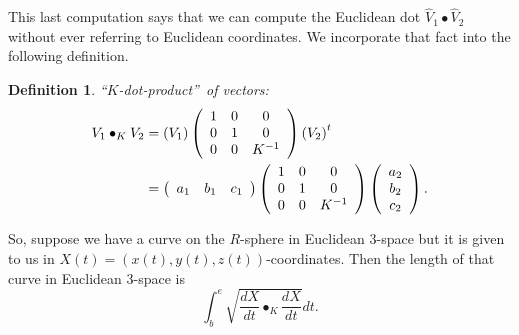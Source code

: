 \documentclass{article}%
\newtheorem{definition}[theorem]{Definition}
\begin{document}
This last computation says that we can compute the Euclidean dot $\hat{V}%
_{1}\bullet\hat{V}_{2}$ without ever referring to Euclidean coordinates. We
incorporate that fact into the following definition.

\begin{definition}
\textquotedblleft$K$-dot-product\textquotedblright\ of vectors:%
\begin{align}
V_{1}\bullet_{K}V_{2}  &  =\left(  V_{1}\right)  \left(
\begin{array}
[c]{ccc}%
1 & 0 & 0\\
0 & 1 & 0\\
0 & 0 & K^{-1}%
\end{array}
\right)  \left(  V_{2}\right)  ^{t}\label{10}\\
&  =\left(
\begin{array}
[c]{ccc}%
a_{1} & b_{1} & c_{1}%
\end{array}
\right)  \left(
\begin{array}
[c]{ccc}%
1 & 0 & 0\\
0 & 1 & 0\\
0 & 0 & K^{-1}%
\end{array}
\right)  \left(
\begin{array}
[c]{c}%
a_{2}\\
b_{2}\\
c_{2}%
\end{array}
\right)  .\nonumber
\end{align}

\end{definition}

So, suppose we have a curve on the $R$-sphere in Euclidean $3$-space but it is
given to us in $X\left(  t\right)  =\left(  x\left(  t\right)  ,y\left(
t\right)  ,z\left(  t\right)  \right)  $-coordinates. Then the length of that
curve in Euclidean $3$-space is%
\[%
{\displaystyle\int\nolimits_{b}^{e}}
\sqrt{\frac{dX}{dt}\bullet_{K}\frac{dX}{dt}}dt.
\]
\end{document}
